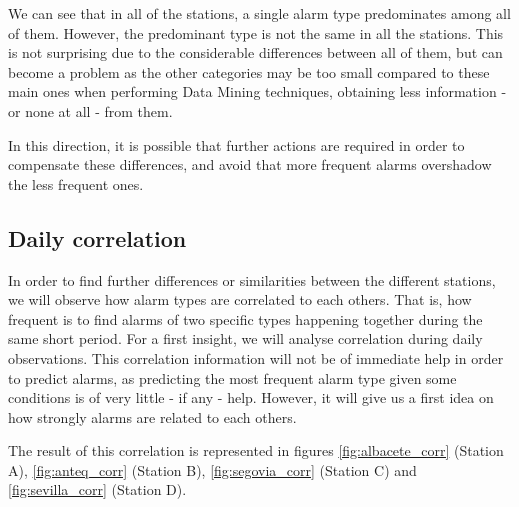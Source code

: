 \clearpage

We can see that in all of the stations, a single alarm type predominates among all of them. However, the predominant type is not the same in all the stations. This is not surprising due to the considerable differences between all of them, but can become a problem as the other categories may be too small compared to these main ones when performing Data Mining techniques, obtaining less information - or none at all - from them.

In this direction, it is possible that further actions are required in order to compensate these differences, and avoid that more frequent alarms overshadow the less frequent ones.

\subsection{Daily correlation}
In order to find further differences or similarities between the different stations, we will observe how alarm types are correlated to each others\cite{edwards1976introduction}. That is, how frequent is to find alarms of two specific types happening together during the same short period. For a first insight, we will analyse correlation during daily observations. This correlation information will not be of immediate help in order to predict alarms, as predicting the most frequent alarm type given some conditions is of very little - if any - help. However, it will give us a first idea on how strongly alarms are related to each others.

The result of this correlation is represented in figures \ref{fig:albacete_corr} (Station A), \ref{fig:anteq_corr} (Station B), \ref{fig:segovia_corr} (Station C) and \ref{fig:sevilla_corr} (Station D).

